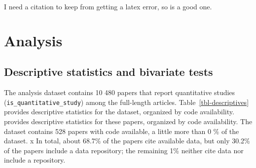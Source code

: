 \documentclass[
  authoryear,
  review,
  3p]{elsarticle}
\begin{document}
I need a citation to keep from getting a latex error, so
\citet{nosek2015promoting} is a good one.

\section{Analysis}\label{analysis}

\subsection{Descriptive statistics and bivariate
tests}\label{descriptive-statistics-and-bivariate-tests}

The analysis dataset contains 10 480 papers that report quantitative
studies (\texttt{is\_quantitative\_study}) among the full-length
articles. Table~\ref{tbl-descriptives} provides descriptive statistics
for the dataset, organized by code availability. provides descriptive
statistics for these papers, organized by code availability. The dataset
contains 528 papers with code available, a little more than 0 \% of the
dataset. x In total, about 68.7\% of the papers cite available data, but
only 30.2\% of the papers include a data repository; the remaining 1\%
neither cite data nor include a repository.
\end{document}
